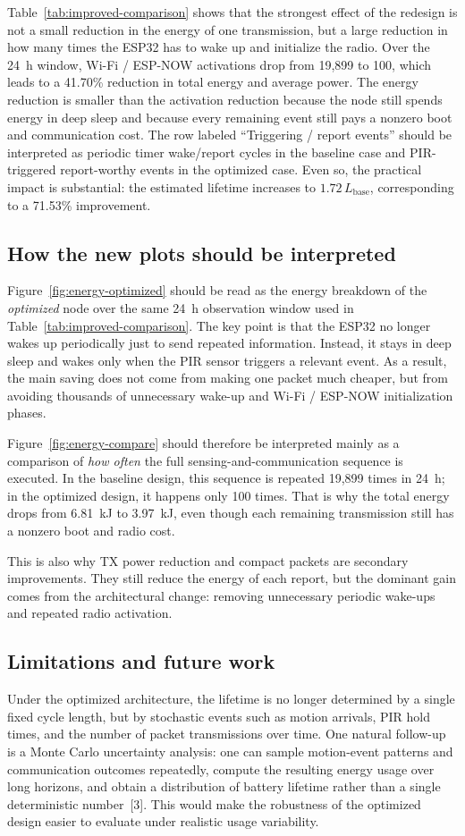 \documentclass[11pt,a4paper]{article}
\begin{document}
Table~\ref{tab:improved-comparison} shows that the strongest effect of the redesign is not a small reduction in the energy of one transmission, but a large reduction in how many times the ESP32 has to wake up and initialize the radio. Over the \SI{24}{h} window, Wi-Fi / ESP-NOW activations drop from 19,899 to 100, which leads to a 41.70\% reduction in total energy and average power. The energy reduction is smaller than the activation reduction because the node still spends energy in deep sleep and because every remaining event still pays a nonzero boot and communication cost. The row labeled ``Triggering / report events'' should be interpreted as periodic timer wake/report cycles in the baseline case and PIR-triggered report-worthy events in the optimized case. Even so, the practical impact is substantial: the estimated lifetime increases to $1.72\,L_{\mathrm{base}}$, corresponding to a 71.53\% improvement.

\subsection{How the new plots should be interpreted}
Figure~\ref{fig:energy-optimized} should be read as the energy breakdown of the \emph{optimized} node over the same \SI{24}{h} observation window used in Table~\ref{tab:improved-comparison}. The key point is that the ESP32 no longer wakes up periodically just to send repeated information. Instead, it stays in deep sleep and wakes only when the PIR sensor triggers a relevant event. As a result, the main saving does not come from making one packet much cheaper, but from avoiding thousands of unnecessary wake-up and Wi-Fi / ESP-NOW initialization phases.

Figure~\ref{fig:energy-compare} should therefore be interpreted mainly as a comparison of \emph{how often} the full sensing-and-communication sequence is executed. In the baseline design, this sequence is repeated 19,899 times in \SI{24}{h}; in the optimized design, it happens only 100 times. That is why the total energy drops from \SI{6.81}{kJ} to \SI{3.97}{kJ}, even though each remaining transmission still has a nonzero boot and radio cost.

This is also why TX power reduction and compact packets are secondary improvements. They still reduce the energy of each report, but the dominant gain comes from the architectural change: removing unnecessary periodic wake-ups and repeated radio activation.
\subsection{Limitations and future work}
Under the optimized architecture, the lifetime is no longer determined by a single fixed cycle length, but by stochastic events such as motion arrivals, PIR hold times, and the number of packet transmissions over time. One natural follow-up is a Monte Carlo uncertainty analysis: one can sample motion-event patterns and communication outcomes repeatedly, compute the resulting energy usage over long horizons, and obtain a distribution of battery lifetime rather than a single deterministic number~[3]. This would make the robustness of the optimized design easier to evaluate under realistic usage variability.
\end{document}
